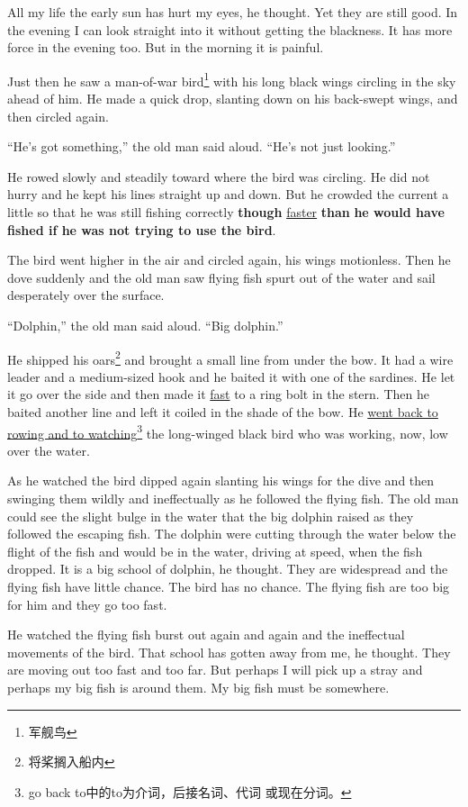 All my life the early sun has hurt my eyes, he thought. Yet they are still
good. In the evening I can look straight into it without getting the
blackness. It has more \gls{force} in the evening too. But in the morning it is
\gls{painful}.

Just then he saw a man-of-war bird\footnote{军舰鸟} with his long black
wings circling in the sky \gls{ahead} of him. He made a quick drop,
\gls{slanting} down on his back-swept wings, and then circled again.

``He's got something,'' the old man said aloud. ``He's not just looking.''

He rowed slowly and steadily toward where the bird was circling. He did not
hurry and he kept his lines straight up and down. But he \gls{crowded} the
current a little so that he was still fishing correctly \textbf{though}
\uline{faster} \textbf{than} \textbf{he would have fished if he was not trying
  to use the bird}.

The bird went higher in the air and circled again, his wings
\gls{motionless}. Then he \gls{dove} suddenly and the old man saw flying
fish \gls{spurt} out of the water and sail \gls{desperately} over the surface.

``Dolphin,'' the old man said aloud. ``Big dolphin.''

He shipped his oars\footnote{将桨搁入船内} and brought a small line from
under the bow. It had a \gls{wire} \gls{leader} and a medium-sized hook and
he baited it with one of the sardines. He let it go over the side and then
made it \uline{fast} to a ring \gls{bolt} in the stern. Then he baited
another line and left it coiled in the shade of the bow. He \uline{went back
  to rowing and to watching}\footnote{go back to中的to为介词，后接名词、代词
  或现在分词。} the long-winged black bird who was working, now, low over
the water.

As he watched the bird dipped again slanting his wings for the dive and then
\gls{swinging} them wildly and \gls{ineffectually} as he followed the flying fish.
The old man could see the \gls{slight} \gls{bulge} in the water that the big
dolphin raised as they followed the escaping fish. The dolphin were cutting
through the water below the flight of the fish and would be in the water,
driving at speed, when the fish dropped. It is a big school of dolphin, he
thought. They are \gls{widespread} and the flying fish have little
\gls{chance}. The bird has no chance. The flying fish are too big for him
and they go too fast.

He watched the flying fish \gls{burst} out again and again and the
\gls{ineffectual} movements of the bird. That school has gotten away from
me, he thought. They are moving out too fast and too far. But perhaps I will
pick up a \gls{stray} and perhaps my big fish is around them. My big fish must be
somewhere.

